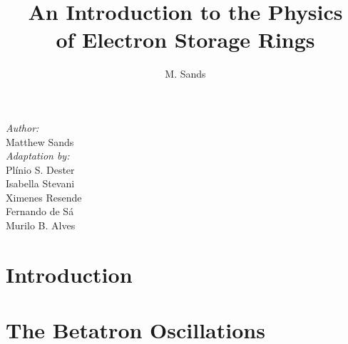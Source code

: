 


\title{An Introduction to the Physics\\ of Electron Storage Rings}
\author{M. Sands}


\maketitle
\vspace{30mm}
\begin{flushright}
    \textit{Author:} \\
    \vspace{1mm}
        Matthew Sands \\
    \vspace{5mm}
    \textit{Adaptation by:} \\
    \vspace{1mm}
	Pl\'inio S. Dester \\
	Isabella Stevani \\
	Ximenes Resende \\
  Fernando de S\'a \\
  Murilo B. Alves \\
\end{flushright}

\thispagestyle{empty}

\newpage
\tableofcontents

\newpage


\chapter{Introduction} \label{ch:1}
    
    
    

\chapter{The Betatron Oscillations} \label{ch:2}
    
    
    
    
    
    
    
    
    
    
    
    

